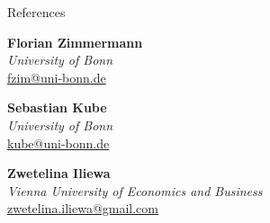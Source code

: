 \documentclass{resume} %
\begin{document}

\newcommand{\cvreference}[3]{%
  \begin{minipage}[t]{0.32\linewidth}
    \raggedright
    \textbf{#1} \\
    \emph{#2} \\
    {\small\color{gray}\href{mailto:#3}{#3}}
  \end{minipage}%
}

\begin{rSection}{References}

\noindent
\cvreference{Florian Zimmermann}{University of Bonn}{fzim@uni-bonn.de}%
\hfill
\cvreference{Sebastian Kube}{University of Bonn}{kube@uni-bonn.de}%
\hfill
\cvreference{Zwetelina Iliewa}{Vienna University of Economics and Business}{zwetelina.iliewa@gmail.com}

\end{rSection}
\end{document}

